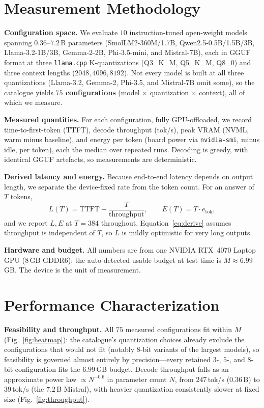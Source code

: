 \documentclass[11pt]{article}
\begin{document}
\section{Measurement Methodology}
\label{sec:method}
\textbf{Configuration space.} We evaluate $10$ instruction-tuned open-weight
models spanning $0.36$--$7.2$\,B parameters (SmolLM2-360M/1.7B,
Qwen2.5-0.5B/1.5B/3B, Llama-3.2-1B/3B, Gemma-2-2B, Phi-3.5-mini, and Mistral-7B),
each in GGUF format at three
\texttt{llama.cpp} K-quantizations (Q3\_K\_M, Q5\_K\_M, Q8\_0) and three context
lengths ($2048,4096,8192$). Not every model is built at all three quantizations
(Llama-3.2, Gemma-2, Phi-3.5, and Mistral-7B omit some), so the catalogue yields
\textbf{$75$ configurations} (model $\times$ quantization $\times$ context), all of
which we measure.

\textbf{Measured quantities.} For each configuration, fully GPU-offloaded, we
record time-to-first-token (TTFT), decode throughput (tok/s), peak VRAM (NVML,
warm minus baseline), and energy per token (board power via \texttt{nvidia-smi},
minus idle, per token), each the median over repeated runs. Decoding is greedy,
with identical GGUF artefacts, so measurements are deterministic.

\textbf{Derived latency and energy.} Because end-to-end latency depends on output
length, we separate the device-fixed rate from the token count. For an answer of
$T$ tokens,
\begin{equation}
L(T)=\mathrm{TTFT}+\frac{T}{\text{throughput}},\qquad E(T)=T\cdot e_{\text{tok}},
\label{eq:derive}
\end{equation}
and we report $L,E$ at $T=384$ throughout. Equation~\eqref{eq:derive} assumes
throughput is independent of $T$, so $L$ is mildly optimistic for very long
outputs.

\textbf{Hardware and budget.} All numbers are from one NVIDIA RTX~4070 Laptop GPU
($8$\,GB GDDR6); the auto-detected usable budget at test time is
$M\approx6.99$\,GB. The device is the unit of measurement.

\section{Performance Characterization}
\label{sec:perf}
\textbf{Feasibility and throughput.} All $75$ measured configurations fit within
$M$ (Fig.~\ref{fig:heatmap}): the catalogue's quantization choices already exclude
the configurations that would not fit (notably $8$-bit variants of the largest
models), so feasibility is governed almost entirely by precision---every retained
$3$-, $5$-, and $8$-bit configuration fits the $6.99$\,GB budget. Decode throughput
falls as an approximate power law $\propto N^{-0.6}$ in parameter count $N$, from
$247$\,tok/s ($0.36$\,B) to $39$\,tok/s (the $7.2$\,B Mistral), with heavier quantization consistently slower at fixed size
(Fig.~\ref{fig:throughput}).
\end{document}
